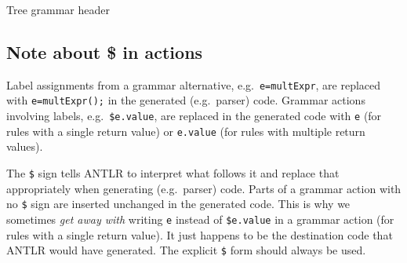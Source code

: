 \begin{program}
\caption{Tree grammar header\label{tour:tree-grammar-header}}
\end{program}


\subsection{Note about \$ in actions}

Label assignments from a grammar alternative, e.g.\ \verb+e=multExpr+,
are replaced with \verb+e=multExpr();+ in the generated (e.g.\ parser) code.
Grammar actions involving labels, e.g.\ \verb=$e.value=,
are replaced in the generated code
with \verb=e= (for rules with a single return value)
or \verb=e.value= (for rules with multiple return values).

The \verb=$= sign tells ANTLR to interpret what follows it
and replace that appropriately when generating (e.g.\ parser) code.
Parts of a grammar action with no \verb=$= sign
are inserted unchanged in the generated code.
This is why we sometimes \emph{get away with}
writing \verb=e= instead of \verb=$e.value= in a grammar action
(for rules with a single return value).
It just happens to be the destination code that ANTLR would have generated.
The explicit \verb=$= form should always be used.
